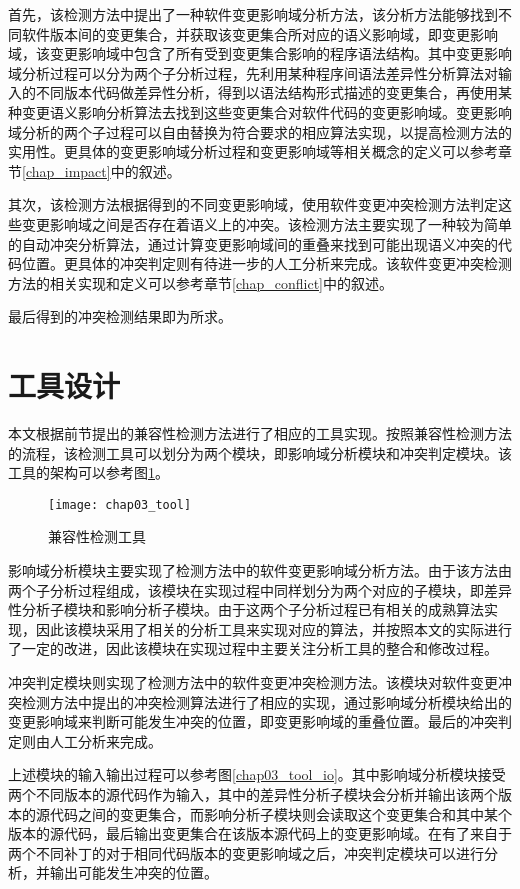 首先，该检测方法中提出了一种软件变更影响域分析方法，该分析方法能够找到不同软件版本间的变更集合，并获取该变更集合所对应的语义影响域，即变更影响域，该变更影响域中包含了所有受到变更集合影响的程序语法结构。其中变更影响域分析过程可以分为两个子分析过程，先利用某种程序间语法差异性分析算法对输入的不同版本代码做差异性分析，得到以语法结构形式描述的变更集合，再使用某种变更语义影响分析算法去找到这些变更集合对软件代码的变更影响域。变更影响域分析的两个子过程可以自由替换为符合要求的相应算法实现，以提高检测方法的实用性。更具体的变更影响域分析过程和变更影响域等相关概念的定义可以参考章节\ref {chap_impact}中的叙述。

其次，该检测方法根据得到的不同变更影响域，使用软件变更冲突检测方法判定这些变更影响域之间是否存在着语义上的冲突。该检测方法主要实现了一种较为简单的自动冲突分析算法，通过计算变更影响域间的重叠来找到可能出现语义冲突的代码位置。更具体的冲突判定则有待进一步的人工分析来完成。该软件变更冲突检测方法的相关实现和定义可以参考章节\ref {chap_conflict}中的叙述。

最后得到的冲突检测结果即为所求。

\section{工具设计}
\label {sec_tool}

本文根据前节提出的兼容性检测方法进行了相应的工具实现。按照兼容性检测方法的流程，该检测工具可以划分为两个模块，即影响域分析模块和冲突判定模块。该工具的架构可以参考图\ref{chap03_tool}。

\begin{figure}[H]
	\centering
	\texttt{[image: chap03\_tool]}
	\caption {兼容性检测工具}
	\label {chap03_tool}	
\end{figure}

影响域分析模块主要实现了检测方法中的软件变更影响域分析方法。由于该方法由两个子分析过程组成，该模块在实现过程中同样划分为两个对应的子模块，即差异性分析子模块和影响分析子模块。由于这两个子分析过程已有相关的成熟算法实现，因此该模块采用了相关的分析工具来实现对应的算法，并按照本文的实际进行了一定的改进，因此该模块在实现过程中主要关注分析工具的整合和修改过程。

冲突判定模块则实现了检测方法中的软件变更冲突检测方法。该模块对软件变更冲突检测方法中提出的冲突检测算法进行了相应的实现，通过影响域分析模块给出的变更影响域来判断可能发生冲突的位置，即变更影响域的重叠位置。最后的冲突判定则由人工分析来完成。

上述模块的输入输出过程可以参考图\ref {chap03_tool_io}。其中影响域分析模块接受两个不同版本的源代码作为输入，其中的差异性分析子模块会分析并输出该两个版本的源代码之间的变更集合，而影响分析子模块则会读取这个变更集合和其中某个版本的源代码，最后输出变更集合在该版本源代码上的变更影响域。在有了来自于两个不同补丁的对于相同代码版本的变更影响域之后，冲突判定模块可以进行分析，并输出可能发生冲突的位置。

